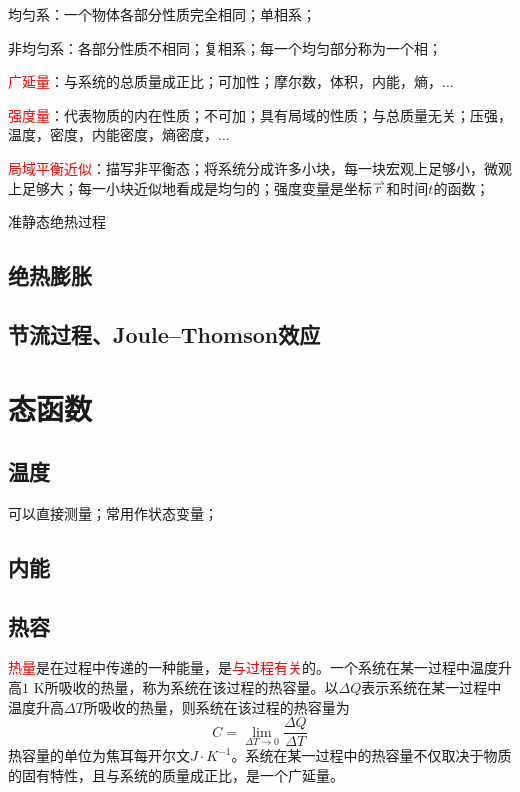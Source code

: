 \documentclass[12pt,a4paper]{article}
\newcommand{\myvec}[1]%
   {\stackrel{\raisebox{-2pt}[0pt][0pt]{\small$\rightharpoonup$}}{#1}}  %
\begin{document}
均匀系：一个物体各部分性质完全相同；单相系；

非均匀系：各部分性质不相同；复相系；每一个均匀部分称为一个相；

\textcolor{red}{广延量}：与系统的总质量成正比；可加性；摩尔数，体积，内能，熵，$\dots$

\textcolor{red}{强度量}：代表物质的内在性质；不可加；具有局域的性质；与总质量无关；压强，温度，密度，内能密度，熵密度，$\dots$

\textcolor{red}{局域平衡近似}：描写非平衡态；将系统分成许多小块，每一块宏观上足够小，微观上足够大；每一小块近似地看成是均匀的；强度变量是坐标$\myvec{r}$和时间$t$的函数；

准静态绝热过程

\subsection{绝热膨胀}


\subsection{节流过程、Joule--Thomson效应}



\section{态函数}

\subsection{温度}

可以直接测量；常用作状态变量；


\subsection{内能}

\subsection{热容}
\textcolor{red}{热量}是在过程中传递的一种能量，是\textcolor{red}{与过程有关}的。一个系统在某一过程中温度升高$1$ K所吸收的热量，称为系统在该过程的热容量。以$\Delta Q$表示系统在某一过程中温度升高$\Delta T$所吸收的热量，则系统在该过程的热容量为
\begin{equation}
C = \underset{\Delta T \rightarrow 0}\lim \frac{\Delta Q}{\Delta T}
\end{equation}
热容量的单位为焦耳每开尔文$J\cdot K^{-1}$。系统在某一过程中的热容量不仅取决于物质的固有特性，且与系统的质量成正比，是一个广延量。
\end{document}
